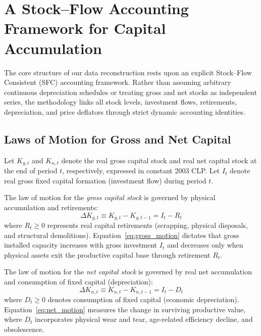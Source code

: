 \section{A Stock--Flow Accounting Framework for Capital Accumulation}\label{sec:framework}

The core structure of our data reconstruction rests upon an explicit Stock--Flow Consistent (SFC) accounting framework. Rather than assuming arbitrary continuous depreciation schedules or treating gross and net stocks as independent series, the methodology links all stock levels, investment flows, retirements, depreciation, and price deflators through strict dynamic accounting identities.

\subsection{Laws of Motion for Gross and Net Capital}
Let $K_{g,t}$ and $K_{n,t}$ denote the real gross capital stock and real net capital stock at the end of period $t$, respectively, expressed in constant 2003 CLP. Let $I_t$ denote real gross fixed capital formation (investment flow) during period $t$.

The law of motion for the \emph{gross capital stock} is governed by physical accumulation and retirements:
\begin{equation}\label{eq:gross_motion}
\Delta K_{g,t} \equiv K_{g,t} - K_{g,t-1} = I_t - R_t
\end{equation}
where $R_t \ge 0$ represents real capital retirements (scrapping, physical disposals, and structural demolitions). Equation~\eqref{eq:gross_motion} dictates that gross installed capacity increases with gross investment $I_t$ and decreases only when physical assets exit the productive capital base through retirement $R_t$.

The law of motion for the \emph{net capital stock} is governed by real net accumulation and consumption of fixed capital (depreciation):
\begin{equation}\label{eq:net_motion}
\Delta K_{n,t} \equiv K_{n,t} - K_{n,t-1} = I_t - D_t
\end{equation}
where $D_t \ge 0$ denotes consumption of fixed capital (economic depreciation). Equation~\eqref{eq:net_motion} measures the change in surviving productive value, where $D_t$ incorporates physical wear and tear, age-related efficiency decline, and obsolescence.

